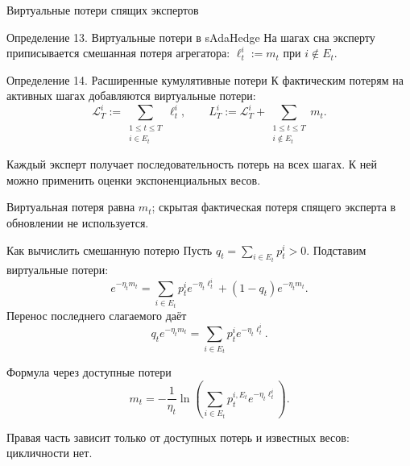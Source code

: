 \documentclass[11pt,aspectratio=169]{beamer}
\begin{document}
\begin{frame}{Виртуальные потери спящих экспертов}
  \begin{block}{Определение 13. Виртуальные потери в sAdaHedge}
    На шагах сна эксперту приписывается смешанная потеря агрегатора:
    $\ell_t^i:=m_t$ при $i\notin E_t$.
  \end{block}
  \begin{block}{Определение 14. Расширенные кумулятивные потери}
    К фактическим потерям на активных шагах добавляются виртуальные потери:
    \[
      \mathcal L_T^i:=\sum_{\substack{1\le t\le T\\i\in E_t}}\ell_t^i,
      \qquad
      L_T^i:=\mathcal L_T^i+\sum_{\substack{1\le t\le T\\i\notin E_t}}m_t.
    \]
  \end{block}
  Каждый эксперт получает последовательность потерь на всех шагах.
  К ней можно применить оценки экспоненциальных весов.
  \par\vfill{\scriptsize Виртуальная потеря равна $m_t$; скрытая фактическая потеря спящего эксперта в обновлении не используется.\par}
\end{frame}

\begin{frame}{Как вычислить смешанную потерю}
  Пусть $q_t=\sum_{i\in E_t}p_t^i>0$. Подставим виртуальные потери:
  \[
    e^{-\eta_t m_t}
    =\sum_{i\in E_t}p_t^i e^{-\eta_t\ell_t^i}
      +(1-q_t)e^{-\eta_t m_t}.
  \]
  Перенос последнего слагаемого даёт
  \[
    q_t e^{-\eta_t m_t}=\sum_{i\in E_t}p_t^i e^{-\eta_t\ell_t^i}.
  \]
  \begin{block}{Формула через доступные потери}
    \[
      m_t=-\frac1{\eta_t}\ln\!\left(\sum_{i\in E_t} p_t^{i,E_t} e^{-\eta_t\ell_t^i}\right).
    \]
  \end{block}
  \par\vfill{\scriptsize Правая часть зависит только от доступных потерь и известных весов: цикличности нет.\par}
\end{frame}
\end{document}
